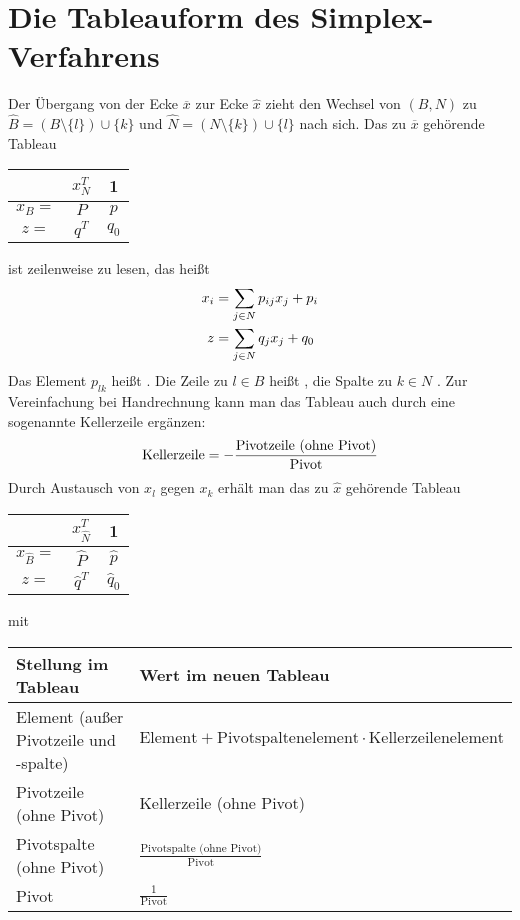 \section{Die Tableauform des Simplex-Verfahrens}

Der Übergang von der Ecke $\overline{x}$ zur Ecke $\hat{x}$ zieht den Wechsel von $(B,N)$ zu $\hat{B} = (B\setminus \{l\})\cup \{k\}$ und $ \hat{N} = (N\setminus \{k\})\cup \{l\}$ nach sich. Das zu $\overline{x}$ gehörende Tableau
\begin{center}
	\begin{tabular}{c|c|c}
		& $x_N^T$ & 1 \\
		\hline
		$x_B=$ & $P$ & $p$ \\
		\hline
		$z = $ & $q^T$ & $q_0$ \\
	\end{tabular}
\end{center}
ist zeilenweise zu lesen, das heißt
\begin{align}
	x_i &= \sum_{j\in N} p_{ij}x_j + p_i \notag \\
	z &= \sum_{j\in N} q_jx_j + q_0 \notag 
\end{align}
Das Element $p_{lk}$ heißt . Die Zeile zu $l\in B$ heißt , die Spalte zu $k\in N$ . Zur Vereinfachung bei Handrechnung kann man das Tableau auch durch eine sogenannte Kellerzeile ergänzen:
\begin{align}
	\text{Kellerzeile} = -\frac{\text{Pivotzeile (ohne Pivot)}}{\text{Pivot}}\notag
\end{align}
Durch Austausch von $x_l$ gegen $x_k$ erhält man das zu $\hat{x}$ gehörende Tableau
\begin{center}
	\begin{tabular}{c|c|c}
		& $x_{\hat{N}}^T$ & 1 \\
		\hline
		$x_{\hat{B}}=$ & $\hat{P}$ & $\hat{p}$ \\
		\hline
		$z = $ & $\hat{q}^T$ & $\hat{q}_0$ \\
	\end{tabular}
\end{center}
mit 
\begin{center}
	\begin{tabular}{p{6cm}|p{8cm}}
		\textbf{Stellung im Tableau} & \textbf{Wert im neuen Tableau} \\
		\hline
		Element (außer Pivotzeile und -spalte) & $\text{Element} + \text{Pivotspaltenelement}\cdot \text{Kellerzeilenelement}$ \\
		Pivotzeile (ohne Pivot) & Kellerzeile (ohne Pivot) \\
		Pivotspalte (ohne Pivot) & $\frac{\text{Pivotspalte (ohne Pivot)}}{\text{Pivot}}$ \\
		Pivot & $\frac{1}{\text{Pivot}}$ \\
	\end{tabular}
\end{center}

